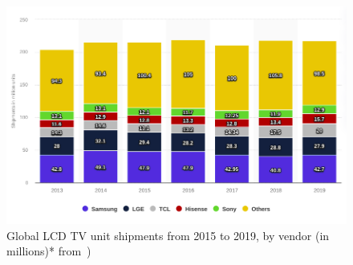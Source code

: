 \begin{figure}
\centering
    \includegraphics[width=0.9\columnwidth]{./img/tvsellings.png}
  \caption{Global LCD TV unit shipments from 2015 to 2019, by vendor (in millions)* from~\cite{tvsellings})}%
\label{fig:tvsells}
\end{figure}
%
